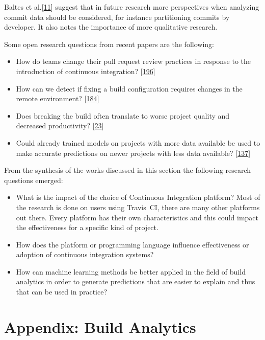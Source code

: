 \documentclass[]{book}
\providecommand{\tightlist}{%
  \setlength{\itemsep}{0pt}\setlength{\parskip}{0pt}}
\begin{document}
Baltes et al.{[}\protect\hyperlink{ref-baltes2018no}{11}{]} suggest that
in future research more perspectives when analyzing commit data should
be considered, for instance partitioning commits by developer. It also
notes the importance of more qualitative research.

Some open research questions from recent papers are the following:

\begin{itemize}
\tightlist
\item
  How do teams change their pull request review practices in response to
  the introduction of continuous integration?
  {[}\protect\hyperlink{ref-zhao2017impact}{196}{]}
\item
  How can we detect if fixing a build configuration requires changes in
  the remote environment?
  {[}\protect\hyperlink{ref-vassallo2018break}{184}{]}
\item
  Does breaking the build often translate to worse project quality and
  decreased productivity?
  {[}\protect\hyperlink{ref-beller2017oops}{23}{]}
\item
  Could already trained models on projects with more data available be
  used to make accurate predictions on newer projects with less data
  available? {[}\protect\hyperlink{ref-ni2018acona}{137}{]}
\end{itemize}

From the synthesis of the works discussed in this section the following
research questions emerged:

\begin{itemize}
\tightlist
\item
  What is the impact of the choice of Continuous Integration platform?
  Most of the research is done on users using Travis~CI, there are many
  other platforms out there. Every platform has their own
  characteristics and this could impact the effectiveness for a specific
  kind of project.
\item
  How does the platform or programming language influence effectiveness
  or adoption of continuous integration systems?
\item
  How can machine learning methods be better applied in the field of
  build analytics in order to generate predictions that are easier to
  explain and thus that can be used in practice?
\end{itemize}

\chapter*{Appendix: Build Analytics}\label{appendix-build-analytics}
\end{document}
